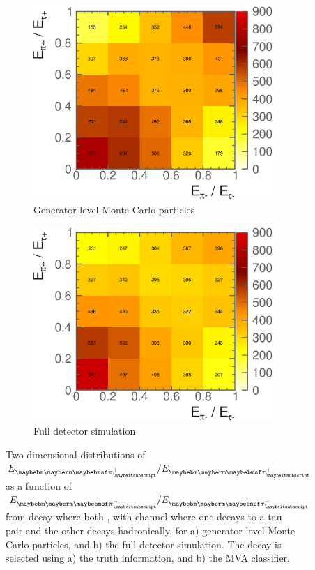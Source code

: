 \begin{figure}[htbp]
\centering %
\begin{subfigure}[b]{0.75\textwidth}
  \includegraphics[width=\textwidth]{tau/NoTimeAnalysis/2DMC}
  \caption{Generator-level  Monte Carlo particles}
  \label{fig:TauSpin2DMC}
\end{subfigure}
\begin{subfigure}[b]{0.75\textwidth}
  \includegraphics[width=\textwidth]{tau/NoTimeAnalysis/2Dreco}
  \caption{Full detector simulation}
  \label{fig:TauSpin2Dreco}
\end{subfigure}
\caption
{Two-dimensional distributions of $E_{\Ppiplus}/E_{\APtauon}$ as a function of $E_{\Ppiminus}/E_{\Ptauon}$ from \ZToTauTau decay where both \tauToPion, with \eeZZ channel where one \PZ decays to a tau pair and the other \PZ decays hadronically,  for a) generator-level  Monte Carlo particles, and b) the full detector simulation. The \tauToPion decay is selected using a) the truth information, and b) the MVA classifier.}
\label{fig:TauSpin2D}
\end{figure}
